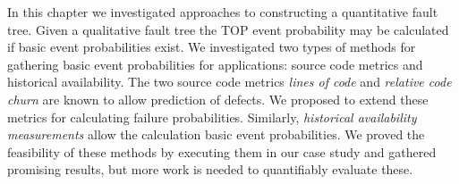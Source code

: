 In this chapter we investigated approaches to constructing a quantitative fault tree. Given a qualitative fault tree the TOP event probability may be calculated if basic event probabilities exist. We investigated two types of methods for gathering basic event probabilities for applications: source code metrics and historical availability. The two source code metrics \emph{lines of code} and \emph{relative code churn} are known to allow prediction of defects. We proposed to extend these metrics for calculating failure probabilities. Similarly, \emph{historical availability measurements} allow the calculation basic event probabilities. We proved the feasibility of these methods by executing them in our case study and gathered promising results, but more work is needed to quantifiably evaluate these.